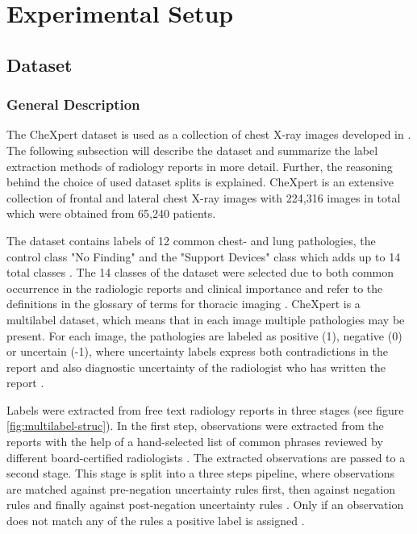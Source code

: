 \section{Experimental Setup}
\label{section: experimental-setup}
\subsection{Dataset}
\subsubsection{General Description}
\label{section: dataset}
The CheXpert dataset is used as a collection of chest X-ray images developed in \citep{Irvin2019}.
The following subsection will describe the dataset and summarize the label extraction methods of radiology reports in more detail.
Further, the reasoning behind the choice of used dataset splits is explained. 
CheXpert is an extensive collection of frontal and lateral chest X-ray images with 224,316 images in total which were obtained from 65,240 patients.
\par
The dataset contains labels of 12 common chest- and lung pathologies, the control class "No Finding" and the "Support Devices" class which adds up to 14 total classes \citep{Irvin2019}.
The 14 classes of the dataset were selected due to both common occurrence in the radiologic reports and clinical importance \citep{Irvin2019} and refer to the definitions in the glossary of terms for thoracic imaging \citep{Hansell2008}.   
CheXpert is a multilabel dataset, which means that in each image multiple pathologies may be present.
For each image, the pathologies are labeled as positive (1), negative (0) or uncertain (-1), where uncertainty labels express both contradictions in the report and also diagnostic uncertainty of the radiologist who has written the report \citep{Irvin2019}.
\par
Labels were extracted from free text radiology reports in three stages (see figure \ref{fig:multilabel-struc}).
In the first step, observations were extracted from the reports with the help of a hand-selected list of common phrases reviewed by different board-certified radiologists \citep{Irvin2019}.
The extracted observations are passed to a second stage.
This stage is split into a three steps pipeline, where observations are matched against pre-negation uncertainty rules first, then against negation rules and finally against post-negation uncertainty rules \citep{Irvin2019}.
Only if an observation does not match any of the rules a positive label is assigned \citep{Irvin2019}.
